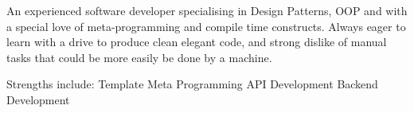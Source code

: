 An experienced software developer specialising in Design Patterns, OOP and with
a special love of meta-programming and compile time constructs. Always eager to
learn with a drive to produce clean elegant code, and strong dislike of manual
tasks that could be more easily be done by a machine.

Strengths include: \newline{} \newline{}
  {Template Meta Programming}
              {API Development}
                     {Backend Development}

